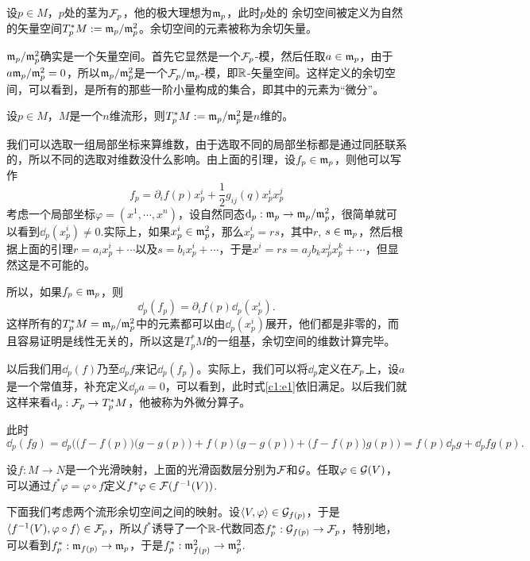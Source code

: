 \para 设$p\in M$，$p$处的茎为$\mathcal{F}_p$，他的极大理想为$\mathfrak{m}_p$，此时$p$处的 余切空间被定义为自然的矢量空间$T_p^*M:=\mathfrak{m}_p/\mathfrak{m}_p^2$。余切空间的元素被称为余切矢量。

$\mathfrak{m}_p/\mathfrak{m}_p^2$确实是一个矢量空间。首先它显然是一个$\mathcal{F}_p$-模，然后任取$a\in \mathfrak{m}_p$，由于$a\mathfrak{m}_p/\mathfrak{m}_p^2=0$，所以$\mathfrak{m}_p/\mathfrak{m}_p^2$是一个$\mathcal{F}_p/\mathfrak{m}_p$-模，即$\mathbb{R}$-矢量空间。这样定义的余切空间，可以看到，是所有的那些一阶小量构成的集合，即其中的元素为“微分”。


\para 设$p\in M$，$M$是一个$n$维流形，则$T_p^*M:=\mathfrak{m}_p/\mathfrak{m}_p^2$是$n$维的。

我们可以选取一组局部坐标来算维数，由于选取不同的局部坐标都是通过同胚联系的，所以不同的选取对维数没什么影响。由上面的引理，设$f_p\in \mathfrak{m}_p$，则他可以写作
\[
	f_p=\partial_i f(p)x^i_p+\frac{1}{2}g_{ij}(q)x^i_px^j_p
\]
考虑一个局部坐标$\varphi=(x^1,\cdots,x^n)$，设自然同态$\mathrm{d}_p:\mathfrak{m}_p\to \mathfrak{m}_p/\mathfrak{m}_p^2$，很简单就可以看到$\dd_p(x^i_p)\neq 0$.实际上，如果$x^i_p\in \mathfrak{m}_p^2$，那么$x^i_p=rs$，其中$r$, $s\in \mathfrak{m}_p$，然后根据上面的引理$r=a_ix^i_p+\cdots$以及$s=b_ix^i_p+\cdots$，于是$x^i=rs=a_jb_kx^j_px^k_p+\cdots$，但显然这是不可能的。

所以，如果$f_p\in \mathfrak{m}_p$，则
\begin{equation}
\label{c1:e1}
	\dd_p(f_p)=\partial_i f(p)\dd_p(x^i_p).
\end{equation}
这样所有的$T_p^*M=\mathfrak{m}_p/\mathfrak{m}_p^2$中的元素都可以由$\dd_p(x^i_p)$展开，他们都是非零的，而且容易证明是线性无关的，所以这是$T_p^*M$的一组基，余切空间的维数计算完毕。

以后我们用$\dd_p(f)$乃至$\dd_pf$来记$\dd_p(f_p)$。实际上，我们可以将$\dd_p$定义在$\mathcal{F}_p$上，设$a$是一个常值芽，补充定义$\dd_pa=0$，可以看到，此时式\eqref{c1:e1}依旧满足。以后我们就这样来看$\mathrm{d}_p:\mathcal{F}_p\to T_p^*M$，他被称为{\kaishu 外微分}算子。

\para 此时\[\dd_p (fg)=\dd_p\bigl(\bigl(f-f(p)\bigr)\bigl(g-g(p)\bigr)+f(p)\bigl(g-g(p)\bigr)+\bigl(f-f(p)\bigr)g(p)\bigr)=f(p)\dd_pg+\dd_pf g(p).\]

\para 设$f:M\to N$是一个光滑映射，上面的光滑函数层分别为$\mathcal{F}$和$\mathcal{G}$。任取$\varphi\in \mathcal{G}(V)$，可以通过$f^*\varphi=\varphi\circ f$定义$f^*\varphi\in \mathcal{F}(f^{-1}(V))$.

下面我们考虑两个流形余切空间之间的映射。设$\langle V,\varphi\rangle\in \mathcal{G}_{f(p)}$，于是$\langle f^{-1}(V),\varphi\circ f\rangle\in \mathcal{F}_p$，所以$f^*$诱导了一个$\mathbb{R}$-代数同态$f^*_p:\mathcal{G}_{f(p)}\to \mathcal{F}_p$，特别地，可以看到$f^*_p:\mathfrak{m}_{f(p)}\to \mathfrak{m}_{p}$，于是$f^*_p:\mathfrak{m}^2_{f(p)}\to \mathfrak{m}^2_{p}$.

